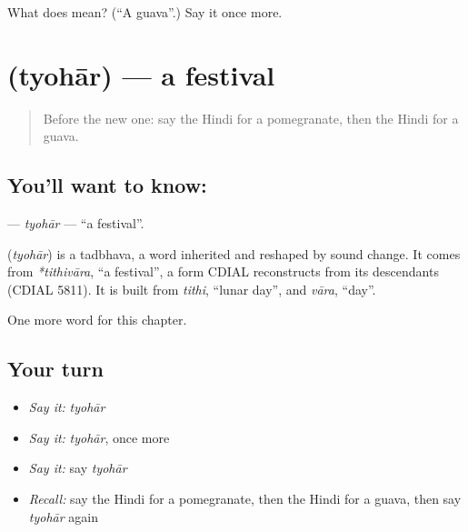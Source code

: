 \begin{tcolorbox}[breakable,colback=teal!4,colframe=teal!35!black,title={Before you move on}]
What does  mean? (\textquotedblleft{}A guava\textquotedblright{}.) Say it once more.
\end{tcolorbox}
\section[\texorpdfstring{\hi{त्योहार} (tyohār)}{त्योहार (tyohār)}]{ (tyohār) — a festival}

\label{lesson:HI-C217-tyohar}



\begin{quote}
Before the new one: say the Hindi for a pomegranate, then the Hindi for a guava.
\end{quote}

\subsection*{You'll want to know: }
\textbf{} — \emph{tyohār} — \textquotedblleft{}a festival\textquotedblright{}.

\begin{cousinweb}
\textbf{} (\emph{tyohār}) is a tadbhava, a word inherited and reshaped by sound change. It comes from \emph{*tithivāra}, \textquotedblleft{}a festival\textquotedblright{}, a form CDIAL reconstructs from its descendants (CDIAL 5811). It is built from \emph{tithi}, \textquotedblleft{}lunar day\textquotedblright{}, and \emph{vāra}, \textquotedblleft{}day\textquotedblright{}.
\end{cousinweb}

\begin{grammarlens}[title={What you've built}]
One more word for this chapter.
\end{grammarlens}

\subsection*{Your turn}
\begin{itemize}
\raggedright
  \item \emph{Say it:} \emph{tyohār}
  \item \emph{Say it:} \emph{tyohār}, once more
  \item \emph{Say it:} say \emph{tyohār}
  \item \emph{Recall:} say the Hindi for a pomegranate, then the Hindi for a guava, then say \emph{tyohār} again
\end{itemize}

